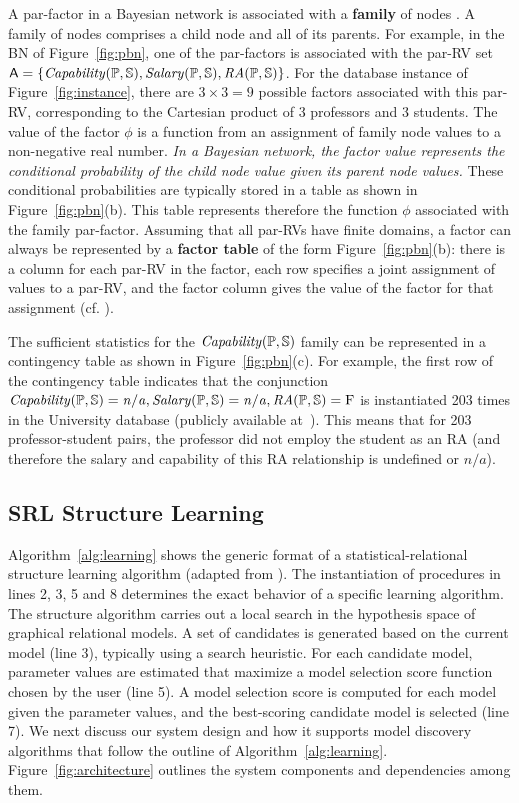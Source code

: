 \documentclass{IEEEtran}
\begin{document}
A par-factor in a Bayesian network is associated with a \textbf{family} of nodes \cite[Sec.2.2.1]{Kimmig2015}. A family of nodes comprises a child node and all of its parents. For example, in the BN of Figure~\ref{fig:pbn}, one of the par-factors is associated with the par-RV set $\parrvs=\{\it{Capability}(\P,\S),\it{Salary}(\P,\S),\it{RA}(\P,\S)\}$. For the database instance of Figure~\ref{fig:instance}, there are $3\times3=9$ possible factors associated with this par-RV, corresponding to the Cartesian product of 3 professors and 3 students. The value of the factor $\phi$ is a function from an assignment of family node values to a non-negative real number. {\em In a Bayesian network, the factor value represents the conditional probability of the child node value given its parent node values.} These conditional probabilities are typically stored in a table as shown in Figure~\ref{fig:pbn}(b). This table represents therefore the function $\phi$ associated with the family par-factor. Assuming that all par-RVs have finite domains, a factor can always be represented by a \textbf{factor table} of the form Figure~\ref{fig:pbn}(b): there is a column for each par-RV in the factor, each row specifies a joint assignment of values to a par-RV, and the factor column gives the value of the factor for that assignment (cf. \cite[Sec.2.2.1]{Kimmig2015}).


The sufficient statistics for the $\it{Capability}(\P,\S)$ family can be represented in a contingency table as shown in Figure~\ref{fig:pbn}(c). For example, the first row of the contingency table indicates that the conjunction \\$\it{Capability}(\P,\S)=n/a,\it{Salary}(\P,\S)=n/a,\it{RA}(\P,\S) =\false$ is instantiated 203 times in the University database (publicly available at~\cite{bib:bbsite}). This means that for 203 professor-student pairs, the professor did not employ the student as an RA (and therefore the salary and capability of this RA relationship is undefined or $n/a$).

\subsection{SRL Structure Learning}

Algorithm~\ref{alg:learning} shows the generic format of a statistical-relational structure learning algorithm (adapted from 
\cite{Kimmig2015}%
). The instantiation of procedures in lines 2, 3, 5 and 8 determines the exact behavior of a specific learning algorithm. The structure algorithm carries out a local search in the hypothesis space of graphical relational models. A set of candidates is generated based on the current model (line 3), typically using a search heuristic. For each candidate model, parameter values are estimated that maximize a model selection score function chosen by the  user (line 5). A model selection score is computed for each model given the parameter values, and the best-scoring candidate model is selected (line 7). 
We next discuss our system design and how it supports model discovery algorithms that follow the outline of Algorithm~\ref{alg:learning}. Figure~\ref{fig:architecture} outlines the system components and dependencies among them.
\end{document}
